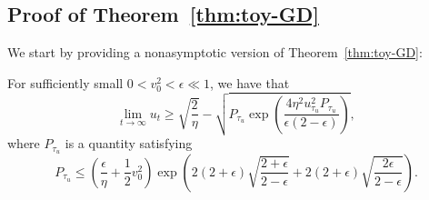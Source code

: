 \subsection{Proof of Theorem~\ref{thm:toy-GD}}
\label{app:pf-toyGD}
We start by providing a nonasymptotic version of Theorem~\ref{thm:toy-GD}:
\begin{theorem}
    \label{thm:toy-GD-full}
    For sufficiently small $0 < v_0^2 < \epsilon \ll 1$, we have that
    \begin{equation}
        \lim_{t \rightarrow \infty} u_t \geq \sqrt{\frac{2}{\eta}} - \sqrt{P_{\tau_u} \exp\left( \frac{4\eta^2 u_{\tau_u}^2 P_{\tau_u}}{\epsilon(2 - \epsilon)} \right)},
    \end{equation}
    where $P_{\tau_u}$ is a quantity satisfying
    \begin{equation}
        P_{\tau_u} \leq \left( \frac{\epsilon}{\eta} + \frac{1}{2} v_0^2 \right) \exp\left( 2(2 + \epsilon) \sqrt{\frac{2 + \epsilon}{2 - \epsilon}} + 2(2 + \epsilon) \sqrt{\frac{2\epsilon}{2 - \epsilon}} \right).
    \end{equation}
\end{theorem}




